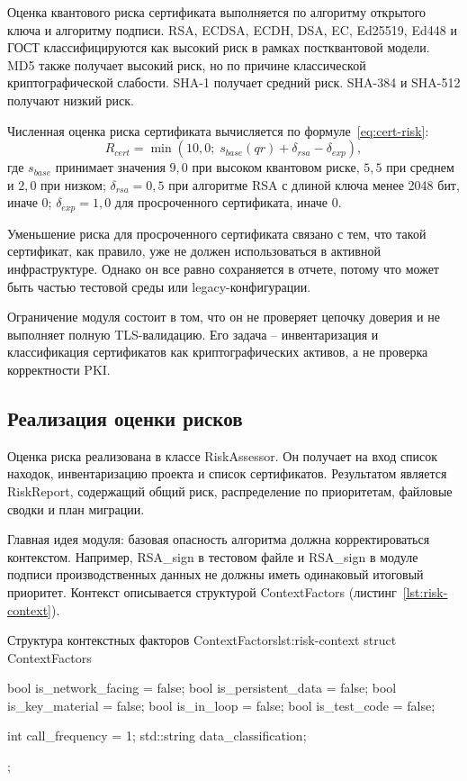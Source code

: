 \documentclass{itmo-vkr}
\begin{document}
Оценка квантового риска сертификата выполняется по алгоритму открытого ключа и алгоритму подписи. RSA, ECDSA, ECDH, DSA, EC, Ed25519, Ed448 и ГОСТ классифицируются как высокий риск в рамках постквантовой модели. MD5 также получает высокий риск, но по причине классической криптографической слабости. SHA-1 получает средний риск. SHA-384 и SHA-512 получают низкий риск.

Численная оценка риска сертификата вычисляется по формуле~\eqref{eq:cert-risk}:
\begin{equation}
\label{eq:cert-risk}
R_{cert} = \min\!\left(10{,}0;\; s_{base}(qr) + \delta_{rsa} - \delta_{exp}\right),
\end{equation}
где $s_{base}$ принимает значения $9{,}0$ при высоком квантовом риске, $5{,}5$ при среднем и $2{,}0$ при низком; $\delta_{rsa} = 0{,}5$ при алгоритме RSA с длиной ключа менее 2048 бит, иначе $0$; $\delta_{exp} = 1{,}0$ для просроченного сертификата, иначе $0$.

Уменьшение риска для просроченного сертификата связано с тем, что такой сертификат, как правило, уже не должен использоваться в активной инфраструктуре. Однако он все равно сохраняется в отчете, потому что может быть частью тестовой среды или legacy-конфигурации.

Ограничение модуля состоит в том, что он не проверяет цепочку доверия и не выполняет полную TLS-валидацию. Его задача -- инвентаризация и классификация сертификатов как криптографических активов, а не проверка корректности PKI.
	
\subsection{Реализация оценки рисков}

Оценка риска реализована в классе RiskAssessor. Он получает на вход список находок, инвентаризацию проекта и список сертификатов. Результатом является RiskReport, содержащий общий риск, распределение по приоритетам, файловые сводки и план миграции.

Главная идея модуля: базовая опасность алгоритма должна корректироваться контекстом. Например, RSA\_sign в тестовом файле и RSA\_sign в модуле подписи производственных данных не должны иметь одинаковый итоговый приоритет. Контекст описывается структурой ContextFactors (листинг~\ref{lst:risk-context}).

\begin{itmolisting}[C++]{Структура контекстных факторов ContextFactors}{lst:risk-context}
struct ContextFactors {
	bool is_network_facing = false;
	bool is_persistent_data = false;
	bool is_key_material = false;
	bool is_in_loop = false;
	bool is_test_code = false;
	
	int call_frequency = 1;
	std::string data_classification;
};
\end{itmolisting}
\end{document}
